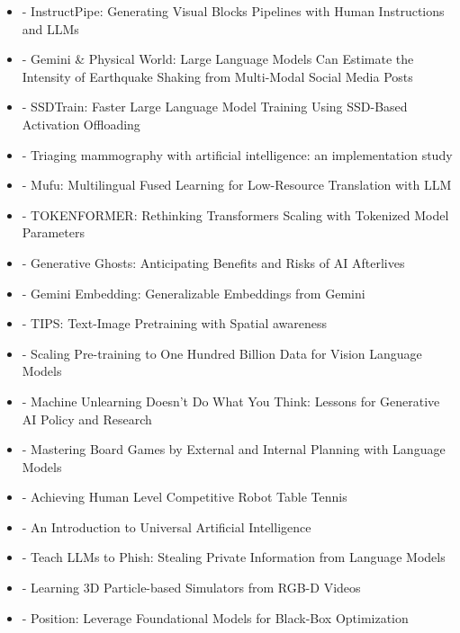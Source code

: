 \documentclass[
  letterpaper,
  DIV=11,
  numbers=noendperiod]{scrartcl}
\providecommand{\tightlist}{%
  \setlength{\itemsep}{0pt}\setlength{\parskip}{0pt}}
\begin{document}
\begin{itemize}
\tightlist
\item
  \autocite{52868} - InstructPipe: Generating Visual Blocks Pipelines
  with Human Instructions and LLMs
\item
  \autocite{1021008} - Gemini \& Physical World: Large Language Models
  Can Estimate the Intensity of Earthquake Shaking from Multi-Modal
  Social Media Posts
\item
  \autocite{1025553} - SSDTrain: Faster Large Language Model Training
  Using SSD-Based Activation Offloading
\item
  \autocite{1024745} - Triaging mammography with artificial
  intelligence: an implementation study
\item
  \autocite{1024143} - Mufu: Multilingual Fused Learning for
  Low-Resource Translation with LLM
\item
  \autocite{1026765} - TOKENFORMER: Rethinking Transformers Scaling with
  Tokenized Model Parameters
\item
  \autocite{morris2024generativeghostsanticipatingbenefits} - Generative
  Ghosts: Anticipating Benefits and Risks of AI Afterlives
\item
  \autocite{lee2025geminiembeddinggeneralizableembeddings} - Gemini
  Embedding: Generalizable Embeddings from Gemini
\item
  \autocite{maninis2025tipstextimagepretrainingspatial} - TIPS:
  Text-Image Pretraining with Spatial awareness
\item
  \autocite{wang2025scalingpretrainingbilliondata} - Scaling
  Pre-training to One Hundred Billion Data for Vision Language Models
\item
  \autocite{cooper2025machineunlearningdoesntthink} - Machine Unlearning
  Doesn't Do What You Think: Lessons for Generative AI Policy and
  Research
\item
  \autocite{schultz2025masteringboardgamesexternal} - Mastering Board
  Games by External and Internal Planning with Language Models
\item
  \autocite{dambrosio2025achievinghumanlevelcompetitive} - Achieving
  Human Level Competitive Robot Table Tennis
\item
  \autocite{Hutter:24uaibook2} - An Introduction to Universal Artificial
  Intelligence
\item
  \autocite{panda2024teach} - Teach LLMs to Phish: Stealing Private
  Information from Language Models
\item
  \autocite{whitney2024learning} - Learning 3D Particle-based Simulators
  from RGB-D Videos
\item
  \autocite{song2024positionleveragefoundationalmodels} - Position:
  Leverage Foundational Models for Black-Box Optimization
\end{itemize}
\end{document}
